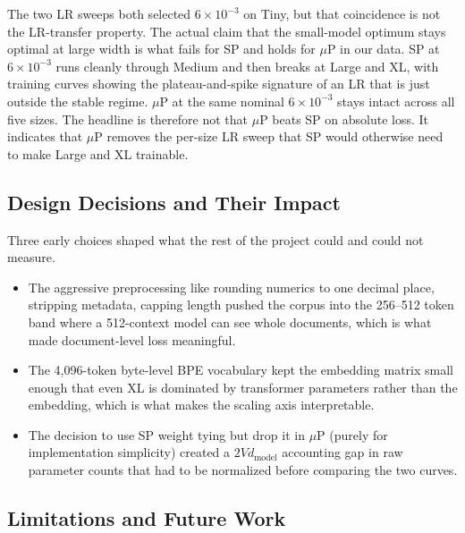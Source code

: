 \documentclass[a4paper]{article}
\begin{document}
The two LR sweeps both selected $6{\times}10^{-3}$ on Tiny, but that coincidence is not the LR-transfer property. The actual claim that the small-model optimum stays optimal at large width is what fails for SP and holds for $\mu$P in our data. SP at $6{\times}10^{-3}$ runs cleanly through Medium and then breaks at Large and XL, with training curves showing the plateau-and-spike signature of an LR that is just outside the stable regime. $\mu$P at the same nominal $6{\times}10^{-3}$ stays intact across all five sizes. The headline is therefore not that $\mu$P beats SP on absolute loss. It indicates that $\mu$P removes the per-size LR sweep that SP would otherwise need to make Large and XL trainable. 

\subsection{Design Decisions and Their Impact}

Three early choices shaped what the rest of the project could and could not measure. 
\begin{itemize}
    \item The aggressive preprocessing like rounding numerics to one decimal place, stripping metadata, capping length pushed the corpus into the 256--512 token band where a 512-context model can see whole documents, which is what made document-level loss meaningful. 
    \item The 4{,}096-token byte-level BPE vocabulary kept the embedding matrix small enough that even XL is dominated by transformer parameters rather than the embedding, which is what makes the scaling axis interpretable. 
    \item The decision to use SP weight tying but drop it in $\mu$P (purely for implementation simplicity) created a $2 V d_{\text{model}}$ accounting gap in raw parameter counts that had to be normalized before comparing the two curves.

\end{itemize}

\subsection{Limitations and Future Work}
\end{document}
